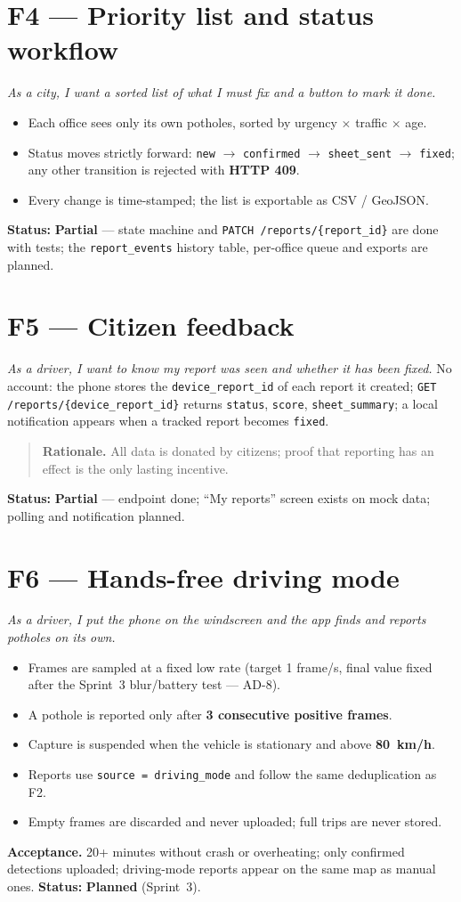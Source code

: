 \documentclass[11pt,a4paper,oneside]{report}
\newcommand{\sPart}{\textcolor{warnorange}{\textbf{Partial}}}
\newcommand{\sPlan}{\textcolor{planblue}{\textbf{Planned}}}
\newcommand{\why}[1]{\begin{quote}\small\textbf{Rationale.} #1\end{quote}}
\begin{document}
\section{F4 --- Priority list and status workflow}
\textit{As a city, I want a sorted list of what I must fix and a button to mark it done.}
\begin{itemize}
\item Each office sees only its own potholes, sorted by urgency $\times$ traffic $\times$ age.
\item Status moves strictly forward: \texttt{new} $\rightarrow$ \texttt{confirmed} $\rightarrow$ \texttt{sheet\_sent}
$\rightarrow$ \texttt{fixed}; any other transition is rejected with \textbf{HTTP 409}.
\item Every change is time-stamped; the list is exportable as CSV / GeoJSON.
\end{itemize}
\textbf{Status:} \sPart{} --- state machine and \texttt{PATCH /reports/\{report\_id\}} are done with tests;
the \texttt{report\_events} history table, per-office queue and exports are planned.

\section{F5 --- Citizen feedback}
\textit{As a driver, I want to know my report was seen and whether it has been fixed.}
No account: the phone stores the \texttt{device\_report\_id} of each report it created;
\texttt{GET /reports/\{device\_report\_id\}} returns \texttt{status}, \texttt{score}, \texttt{sheet\_summary};
a local notification appears when a tracked report becomes \texttt{fixed}.
\why{All data is donated by citizens; proof that reporting has an effect is the only lasting incentive.}
\textbf{Status:} \sPart{} --- endpoint done; ``My reports'' screen exists on mock data; polling and notification planned.

\section{F6 --- Hands-free driving mode}
\textit{As a driver, I put the phone on the windscreen and the app finds and reports potholes on its own.}
\begin{itemize}
\item Frames are sampled at a fixed low rate (target 1 frame/s, final value fixed after the Sprint~3 blur/battery test --- AD-8).
\item A pothole is reported only after \textbf{3 consecutive positive frames}.
\item Capture is suspended when the vehicle is stationary and above \textbf{80~km/h}.
\item Reports use \texttt{source = driving\_mode} and follow the same deduplication as F2.
\item Empty frames are discarded and never uploaded; full trips are never stored.
\end{itemize}
\textbf{Acceptance.} 20+ minutes without crash or overheating; only confirmed detections uploaded; driving-mode
reports appear on the same map as manual ones. \textbf{Status:} \sPlan{} (Sprint~3).
\end{document}
